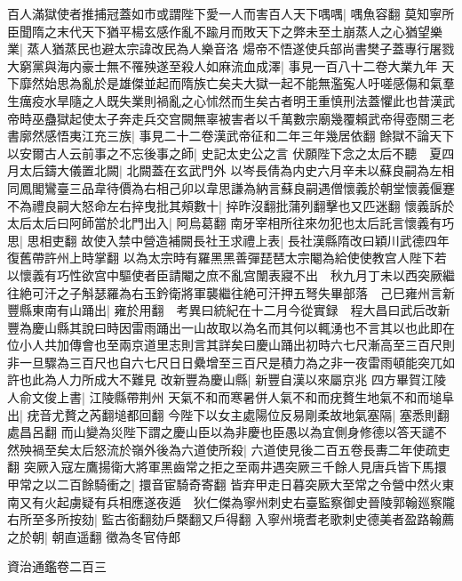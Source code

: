 百人滿獄使者推捕冠蓋如市或謂陛下愛一人而害百人天下喁喁|{
	喁魚容翻}
莫知寧所臣聞隋之末代天下猶平楊玄感作亂不踰月而敗天下之弊未至土崩蒸人之心猶望樂業|{
	蒸人猶蒸民也避太宗諱改民為人樂音洛}
煬帝不悟遂使兵部尚書樊子蓋專行屠戮大窮黨與海内豪士無不罹殃遂至殺人如麻流血成澤|{
	事見一百八十二卷大業九年}
天下靡然始思為亂於是雄傑並起而隋族亡矣夫大獄一起不能無濫寃人吁嗟感傷和氣羣生癘疫水旱隨之人既失業則禍亂之心怵然而生矣古者明王重慎刑法蓋懼此也昔漢武帝時巫蠱獄起使太子奔走兵交宫闕無辜被害者以千萬數宗廟幾覆賴武帝得壺關三老書廓然感悟夷江充三族|{
	事見二十二卷漢武帝征和二年三年幾居依翻}
餘獄不論天下以安爾古人云前事之不忘後事之師|{
	史記太史公之言}
伏願陛下念之太后不聽　夏四月太后鑄大儀置北闕|{
	北闕蓋在玄武門外}
以岑長倩為内史六月辛未以蘇良嗣為左相同鳳閣鸞臺三品韋待價為右相己卯以韋思謙為納言蘇良嗣遇僧懷義於朝堂懷義偃蹇不為禮良嗣大怒命左右捽曳批其頰數十|{
	捽昨沒翻批蒲列翻擊也又匹迷翻}
懷義訴於太后太后曰阿師當於北門出入|{
	阿烏葛翻}
南牙宰相所往來勿犯也太后託言懷義有巧思|{
	思相吏翻}
故使入禁中營造補闕長社王求禮上表|{
	長社漢縣隋改曰穎川武德四年復舊帶許州上時掌翻}
以為太宗時有羅黑黑善彈琵琶太宗閹為給使使教宫人陛下若以懷義有巧性欲宫中驅使者臣請閹之庶不亂宫闈表寢不出　秋九月丁未以西突厥繼往絶可汗之子斛瑟羅為右玉鈐衛將軍襲繼往絶可汗押五弩失畢部落　己巳雍州言新豐縣東南有山踊出|{
	雍於用翻　考異曰統紀在十二月今從實録　程大昌曰武后改新豐為慶山縣其說曰時因雷雨踊出一山故取以為名而其何以輒湧也不言其以也此即在位小人共加傳會也至兩京道里志則言其詳矣曰慶山踊出初時六七尺漸高至三百尺則非一旦驟為三百尺也自六七尺日日纍增至三百尺是積力為之非一夜雷雨頓能突兀如許也此為人力所成大不難見}
改新豐為慶山縣|{
	新豐自漢以來屬京兆}
四方畢賀江陵人俞文俊上書|{
	江陵縣帶荆州}
天氣不和而寒暑併人氣不和而疣贅生地氣不和而塠阜出|{
	疣音尤贅之芮翻塠都回翻}
今陛下以女主處陽位反易剛柔故地氣塞隔|{
	塞悉則翻處昌呂翻}
而山變為災陛下謂之慶山臣以為非慶也臣愚以為宜側身修德以答天譴不然殃禍至矣太后怒流於嶺外後為六道使所殺|{
	六道使見後二百五卷長夀二年使疏吏翻}
突厥入寇左鷹揚衛大將軍黑齒常之拒之至兩井遇突厥三千餘人見唐兵皆下馬擐甲常之以二百餘騎衝之|{
	擐音宦騎奇寄翻}
皆弃甲走日暮突厥大至常之令營中然火東南又有火起虜疑有兵相應遂夜遁　狄仁傑為寧州刺史右臺監察御史晉陵郭翰廵察隴右所至多所按劾|{
	監古銜翻劾戶槩翻又戶得翻}
入寧州境耆老歌刺史德美者盈路翰薦之於朝|{
	朝直遥翻}
徵為冬官侍郎

資治通鑑卷二百三
